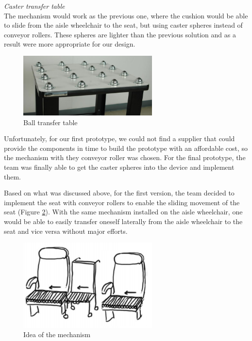 \newpage

\noindent\emph{Caster transfer table}\\
The mechanism would work as the previous one, where the cushion would be able to slide from the aisle wheelchair to the seat, but using caster spheres instead of conveyor rollers. These spheres are lighter than the previous solution and as a result were more appropriate for our design.

\begin{figure}[h]
\centering
\includegraphics[width=7cm]{brazil_images/image037.jpg}
\caption{Ball transfer table}%
\label{fig:ball_transfer}
\end{figure}

Unfortunately, for our first prototype, we could not find a supplier that could provide the components in time to build the prototype with an affordable cost, so the mechanism with they conveyor roller was chosen. For the final prototype, the team was finally able to get the caster spheres into the device and implement them.

Based on what was discussed above, for the first version, the team decided to implement the seat with conveyor rollers to enable the sliding movement of the seat (Figure \ref{fig:idea_mechanism}). With the same mechanism installed on the aisle wheelchair, one would be able to easily transfer oneself laterally from the aisle wheelchair to the seat and vice versa without major efforts.

\begin{figure}[h]
\centering
\includegraphics[width=7cm]{brazil_images/image038.png}
\caption{Idea of the mechanism}
\label{fig:idea_mechanism}
\end{figure}


